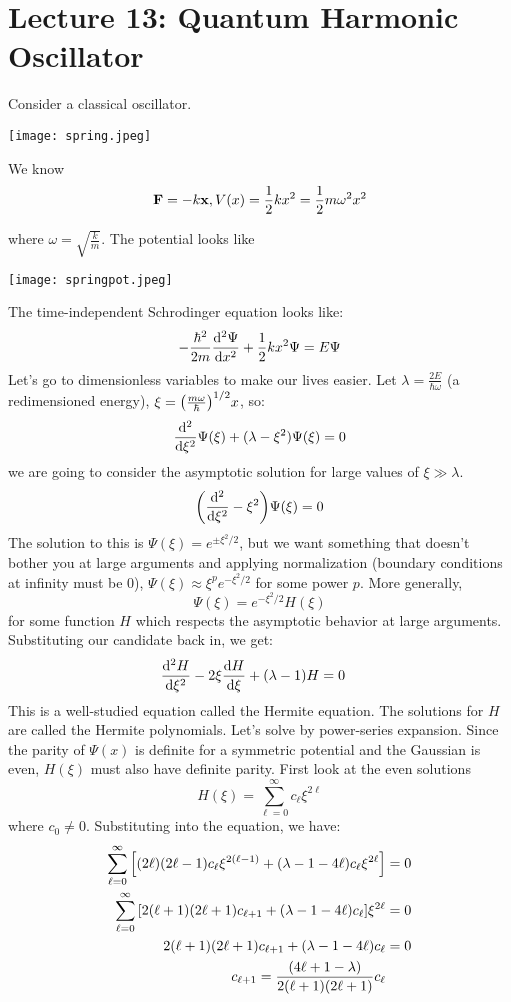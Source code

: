 \section{Lecture 13: Quantum Harmonic Oscillator}

Consider a classical oscillator. 

\texttt{[image: spring.jpeg]}

We know
\[ \mathbf{F} = - k \mathbf{x}, V(x) = \frac{1}{2} kx^2 = \frac{1}{2} m \omega^2 x^2 \]

where $\omega = \sqrt{\frac{k}{m}}$. The potential looks like

\texttt{[image: springpot.jpeg]}

The time-independent Schrodinger equation looks like:
\[ -\frac{\hbar^2}{2m} \derivative{^2 \Psi}{x^2} + \frac{1}{2} kx^2 \Psi = E \Psi \]
Let's go to dimensionless variables to make our lives easier. Let $\lambda = \frac{2E}{\hbar \omega}$ (a redimensioned energy),
$\xi = \qty(\frac{m \omega}{\hbar})^{1/2} x$, so:
\[ \derivative{^2}{\xi^2} \Psi(\xi) + (\lambda - \xi^2) \Psi(\xi) = 0 \]
we are going to consider the asymptotic solution for large values of $\xi \gg \lambda$.
\[  \qty(\derivative{^2}{\xi^2} - \xi^2) \Psi(\xi) = 0 \]
The solution to this is $\Psi(\xi) = e^{\pm \xi^2/2}$, but we want something
that doesn't bother you at large arguments
and applying normalization (boundary conditions at infinity must be 0), $\Psi(\xi) \approx \xi^p e^{-\xi^2/2}$ for some power $p$.
More generally,
\[ \Psi(\xi) = e^{-\xi^2/2} H(\xi) \]
for some function $H$ which respects the asymptotic behavior at large arguments. Substituting
our candidate back in, we get:
\begin{align*}
    \derivative{^2H}{\xi^2} - 2 \xi \derivative{H}{\xi} + (\lambda - 1)H &= 0
\end{align*}
This is a well-studied equation called the Hermite equation. The solutions for $H$ are called the Hermite polynomials.
Let's solve by power-series expansion. Since the parity of $\Psi(x)$ is definite
for a symmetric potential and the Gaussian is even, $H(\xi)$ must also have definite parity.
First look at the even solutions
\[ H(\xi) = \sum_{\ell = 0}^{\infty} c_{\ell} \xi^{2\ell} \]
where $c_0 \neq 0$. Substituting into the equation, we have:
\begin{align*}
    \sum_{\ell = 0}^{\infty} \qty[(2 \ell)(2 \ell - 1) c_{\ell} \xi^{2(\ell - 1)} + (\lambda - 1 - 4\ell) c_{\ell}\xi^{2\ell}] &= 0 \\
    \sum_{\ell = 0}^{\infty} \qty[2(\ell + 1)(2 \ell + 1) c_{\ell + 1} + (\lambda - 1 - 4\ell) c_{\ell}]\xi^{2\ell} &= 0 \\
    2(\ell + 1)(2 \ell + 1) c_{\ell + 1} + (\lambda - 1 - 4\ell) c_{\ell} &= 0 \\
    c_{\ell + 1} = \frac{(4\ell + 1 - \lambda)}{2(\ell + 1)(2 \ell + 1)} c_{\ell}
\end{align*}
